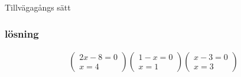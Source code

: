 \begin{multicols}{2}
\begin{exampleblock}{Tillvägagångs sätt}
\subsubsection{lösning}
\begin{align*}
\left( \begin{array} { c } { 2 x - 8 = 0 } \\ { x = 4 } \end{array} \right)
\left( \begin{array} { c } { 1 - x = 0 } \\ { x = 1 } \end{array} \right)
\left( \begin{array} { c } { x - 3 = 0 } \\ { x = 3 } \end{array} \right)
\end{align*}


\end{exampleblock}
\end{multicols}
